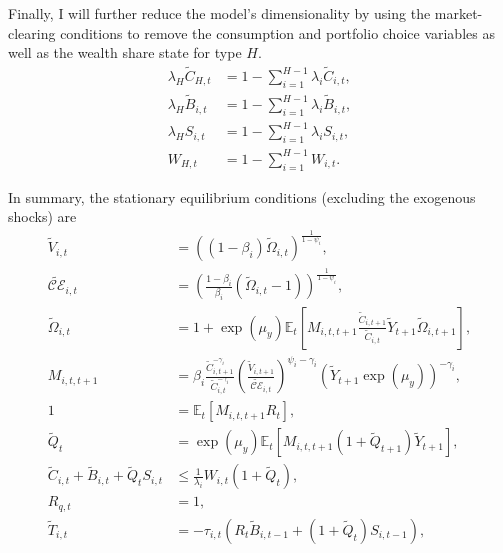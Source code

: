 \documentclass[12 pt, oneside]{article}
\theoremstyle{definition}
\theoremstyle{definition}
\theoremstyle{definition}
\newcommand{\E}{\mathbb{E}}
\newcommand{\calC}{\mathcal{C}}
\newcommand{\calE}{\mathcal{E}}
\begin{document}
Finally, I will further reduce the model's dimensionality by using the market-clearing conditions to remove the consumption and portfolio choice variables as well as the wealth share state for type $H$.
\begin{align}
  \lambda_H \tilde{C}_{H, t} & = 1 - \sum_{i = 1}^{H - 1} \lambda_i \tilde{C}_{i, t},\\
  \lambda_H \tilde{B}_{i, t} & = 1 - \sum_{i = 1}^{H - 1} \lambda_i \tilde{B}_{i, t},\\
  \lambda_H S_{i, t} & = 1 - \sum_{i = 1}^{H - 1} \lambda_i S_{i, t},\\
  W_{H, t} & = 1 - \sum_{i = 1}^{H - 1} W_{i, t}.
\end{align}

In summary, the stationary equilibrium conditions (excluding the exogenous shocks) are
\begin{align}
  \label{eq:epstein zin defn eqm stat}
  \tilde{V}_{i, t} & = ((1 - \beta_i)\tilde{\Omega}_{i, t})^{\frac{1}{1 - \psi_i}},\\
  \label{eq:certainty equivalent eqm stat}
  \tilde{\calC\calE}_{i, t} & = \left(\frac{1 - \beta_i}{\beta_i}(\tilde{\Omega}_{i, t} - 1)\right)^{\frac{1}{1 - \psi_i}},\\
  \label{eq:epstein zin wealth recursion eqm stat}
  \tilde{\Omega}_{i, t} & = 1 + \exp(\mu_y)\E_t\left[M_{i, t, t + 1}\frac{\tilde{C}_{i, t + 1}}{\tilde{C}_{i, t}}\tilde{Y}_{t + 1}\tilde{\Omega}_{i, t + 1}\right],\\
  \label{eq:stochastic discount factor eqm stat}
  M_{i, t, t + 1} & = \beta_i\frac{\tilde{C}_{i, t + 1}^{- \gamma_i } }{\tilde{C}_{i, t}^{-\gamma_i} }\left(\frac{\tilde{V}_{i, t + 1}}{\tilde{\calC\calE}_{i, t}}\right)^{ \psi_i - \gamma_i}\left(\tilde{Y}_{t + 1}\exp(\mu_y)\right)^{-\gamma_i},\\
  \label{eq:euler eqn eqm stat}
  1 & = \E_t\left[M_{i, t, t + 1}R_t\right],\\
  \label{eq:tree asset pricing eqm stat}
  \tilde{Q}_t & = \exp(\mu_y)\E_t[M_{i, t, t + 1}(1 + \tilde{Q}_{t + 1})\tilde{Y}_{t + 1}],\\
  \label{eq:hh budget constraint with wealth share eqm stat}
  \tilde{C}_{i, t} + \tilde{B}_{i, t} + \tilde{Q}_t S_{i, t} & \leq \frac{1}{\lambda_i} W_{i, t} (1 + \tilde{Q}_t),\\
  \label{eq:Rq defn eqm stat}
  R_{q, t} & = 1,\\
  \label{eq:net transfer rule eqm stat}
  \tilde{T}_{i, t} & = -\tau_{i, t}(R_t \tilde{B}_{i, t - 1} + (1 + \tilde{Q}_t)S_{i, t - 1}),\\

\end{align}
\end{document}
